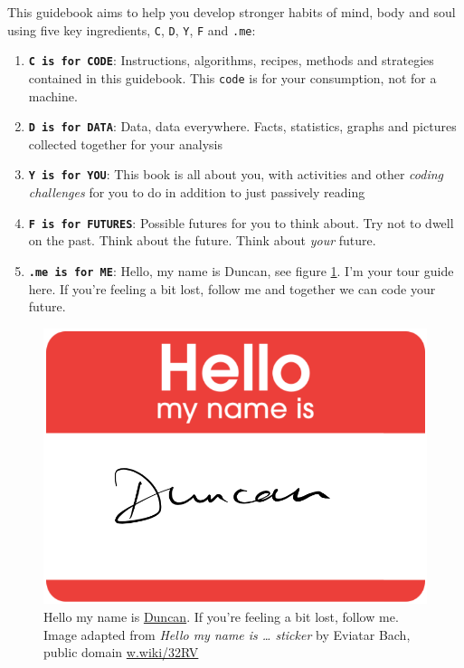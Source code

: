 \documentclass[
]{book}
\providecommand{\tightlist}{%
  \setlength{\itemsep}{0pt}\setlength{\parskip}{0pt}}
\begin{document}
This guidebook aims to help you develop stronger habits of mind, body and soul using five key ingredients, \texttt{C}, \texttt{D}, \texttt{Y}, \texttt{F} and \texttt{.me}:

\begin{enumerate}
\def\labelenumi{\arabic{enumi}.}
\tightlist
\item
  \textbf{\texttt{C\ is\ for\ CODE}}: Instructions, algorithms, recipes, methods and strategies contained in this guidebook. This \texttt{code} is for your consumption, not for a machine.
\item
  \textbf{\texttt{D\ is\ for\ DATA}}: Data, data everywhere. Facts, statistics, graphs and pictures collected together for your analysis
\item
  \textbf{\texttt{Y\ is\ for\ YOU}}: This book is all about you, with activities and other \emph{coding challenges} for you to do in addition to just passively reading
\item
  \textbf{\texttt{F\ is\ for\ FUTURES}}: Possible futures for you to think about. Try not to dwell on the past. Think about the future. Think about \emph{your} future. \citep{thinkaboutthefuture, wroteforluck}
\item
  \textbf{\texttt{.me\ is\ for\ ME}}: Hello, my name is Duncan, see figure \ref{fig:hello-my-name-fig}. I'm your tour guide here. If you're feeling a bit lost, follow me and together we can code your future.
\end{enumerate}

\begin{figure}

{\centering \includegraphics[width=0.89\linewidth]{images/Hello-my-name-is-Duncan} 

}

\caption{Hello my name is \href{https://en.wikipedia.org/wiki/Duncan_(given_name)}{Duncan}. If you're feeling a bit lost, follow me. Image adapted from \emph{Hello my name is \ldots{} sticker} by Eviatar Bach, public domain \href{https://w.wiki/32RV}{w.wiki/32RV}}\label{fig:hello-my-name-fig}
\end{figure}
\end{document}
